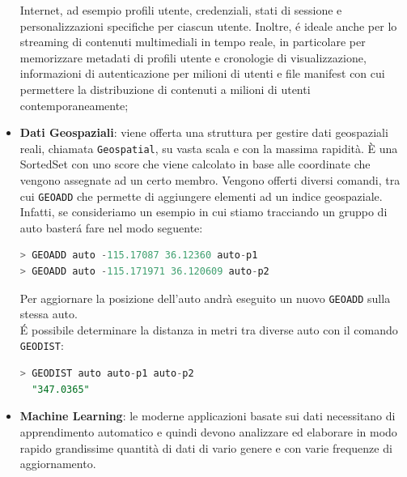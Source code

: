 \begin{itemize}
    Internet, ad esempio profili utente, credenziali, stati di sessione e personalizzazioni specifiche per ciascun utente. Inoltre, é ideale anche
    per lo streaming di contenuti multimediali in tempo reale, in particolare per memorizzare metadati di profili utente e cronologie di visualizzazione,
    informazioni di autenticazione per milioni di utenti e file manifest con cui permettere la distribuzione di contenuti a milioni di utenti
    contemporaneamente;
    \item \textbf{Dati Geospaziali}: viene offerta una struttura per gestire dati geospaziali reali, chiamata \texttt{Geospatial},
    su vasta scala e con la massima rapidità. È una SortedSet con uno score che viene calcolato in base alle coordinate che vengono assegnate ad un certo membro.
    Vengono offerti diversi comandi, tra cui \texttt{GEOADD} che permette di aggiungere elementi ad un indice geospaziale.
    Infatti, se consideriamo un esempio in cui stiamo tracciando un gruppo di auto basterá fare nel modo seguente:
    \begin{lstlisting}[autogobble, style=redis-cli, language=SQL]
> GEOADD auto -115.17087 36.12360 auto-p1
> GEOADD auto -115.171971 36.120609 auto-p2\end{lstlisting}
    Per aggiornare la posizione dell'auto andrà eseguito un nuovo \texttt{GEOADD} sulla stessa auto.\\
    É possibile determinare la distanza in metri tra diverse auto con il comando \texttt{GEODIST}:
    \begin{lstlisting}[autogobble, style=redis-cli, language=SQL]
> GEODIST auto auto-p1 auto-p2
  "347.0365"\end{lstlisting}
    \item \textbf{Machine Learning}: le moderne applicazioni basate sui dati necessitano di apprendimento automatico e quindi devono analizzare
    ed elaborare in modo rapido grandissime quantità di dati di vario genere e con varie frequenze di aggiornamento.
\end{itemize}


